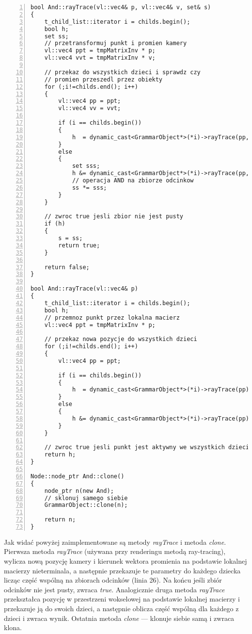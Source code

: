 {
\small
\begin{lstlisting}[numbers=left,frame=single,numberstyle=\tiny,backgroundcolor=\color{code_back},breaklines=true]
bool And::rayTrace(vl::vec4& p, vl::vec4& v, set& s)
{
    t_child_list::iterator i = childs.begin();
    bool h;
    set ss;
    // przetransformuj punkt i promien kamery
    vl::vec4 ppt = tmpMatrixInv * p;
    vl::vec4 vvt = tmpMatrixInv * v;

    // przekaz do wszystkich dzieci i sprawdz czy
    // promien przeszedl przez obiekty
    for (;i!=childs.end(); i++)
    {
        vl::vec4 pp = ppt;
        vl::vec4 vv = vvt;

        if (i == childs.begin())
        {
            h  = dynamic_cast<GrammarObject*>(*i)->rayTrace(pp, vv, ss);
        }
        else
        {
            set sss;
            h &= dynamic_cast<GrammarObject*>(*i)->rayTrace(pp, vv, sss);
            // operacja AND na zbiorze odcinkow
            ss *= sss;
        }
    }

    // zwroc true jesli zbior nie jest pusty
    if (h)
    {
        s = ss;
        return true;
    }

    return false;
}

bool And::rayTrace(vl::vec4& p)
{
    t_child_list::iterator i = childs.begin();
    bool h;
    // przemnoz punkt przez lokalna macierz
    vl::vec4 ppt = tmpMatrixInv * p;

    // przekaz nowa pozycje do wszystkich dzieci
    for (;i!=childs.end(); i++)
    {
        vl::vec4 pp = ppt;

        if (i == childs.begin())
        {
            h  = dynamic_cast<GrammarObject*>(*i)->rayTrace(pp);
        }
        else
        {
            h &= dynamic_cast<GrammarObject*>(*i)->rayTrace(pp);
        }
    }

    // zwroc true jesli punkt jest aktywny we wszystkich dzieciach
    return h;
}

Node::node_ptr And::clone()
{
    node_ptr n(new And);
    // sklonuj samego siebie
    GrammarObject::clone(n);

    return n;
}
\end{lstlisting}
}

Jak widać powyżej zaimplementowane są metody \emph{rayTrace} i metoda
\emph{clone}. Pierwsza metoda \emph{rayTrace} (używana przy renderingu metodą
ray-tracing), wylicza nową pozycję kamery i kierunek wektora promienia na
podstawie lokalnej macierzy nieterminala, a następnie przekazuje te parametry do
każdego dziecka licząc część wspólną na zbiorach odcinków (linia 26). Na końcu
jeśli zbiór odcinków nie jest pusty, zwraca \emph{true}. Analogicznie druga
metoda \emph{rayTrace} przekształca pozycję w przestrzeni wokselowej na
podstawie lokalnej macierzy i przekazuje ją do swoich dzieci, a następnie
oblicza część wspólną dla każdego z dzieci i zwraca wynik. Ostatnia metoda
\emph{clone} --- klonuje siebie samą i zwraca klona.
